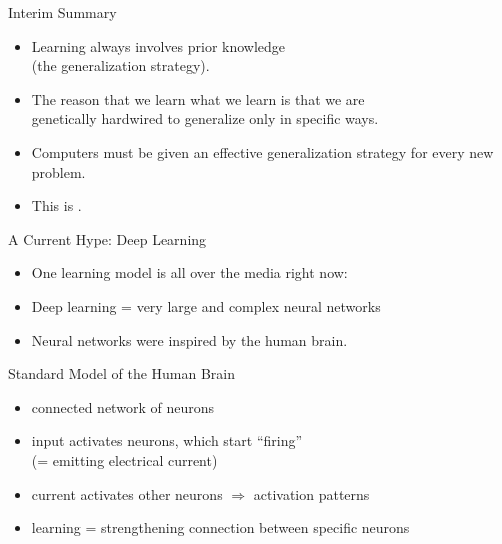 \documentclass[xcolor={usenames,svgnames,x11names,dvipsnames,table}]{beamer}
\begin{document}
\begin{frame}{Interim Summary}
    \begin{itemize}
        \item Learning always involves prior knowledge\\
            (the generalization strategy).
        \item The reason that we learn what we learn is that we are\\
            genetically hardwired to generalize only in specific ways.
        \item Computers must be given an effective generalization strategy for every new problem.
        \item This is .
    \end{itemize}

\end{frame}

\begin{frame}{A Current Hype: Deep Learning}
    \begin{itemize}
        \item One learning model is all over the media right now:\\
        \item Deep learning = very large and complex neural networks
        \item Neural networks were inspired by the human brain.
    \end{itemize}

    \pause
    \begin{block}{Standard Model of the Human Brain}
        \begin{itemize}
            \item connected network of neurons
            \item input activates neurons, which start ``firing''\\
                (= emitting electrical current)
            \item current activates other neurons $\Rightarrow$ activation patterns
            \item learning = strengthening connection between specific neurons
        \end{itemize}
    \end{block}
\end{frame}
\end{document}
